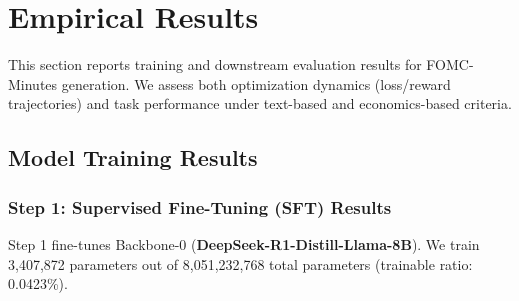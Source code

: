 \section{Empirical Results}\label{ch2:sec:result}
This section reports training and downstream evaluation results for FOMC-Minutes generation. We assess both optimization dynamics (loss/reward trajectories) and task performance under text-based and economics-based criteria.


\subsection*{Model Training Results}

\subsubsection*{Step 1: Supervised Fine-Tuning (SFT) Results}

Step 1 fine-tunes Backbone-0 (\textbf{DeepSeek-R1-Distill-Llama-8B}). We train 3,407,872 parameters out of 8,051,232,768 total parameters (trainable ratio: 0.0423\%).

